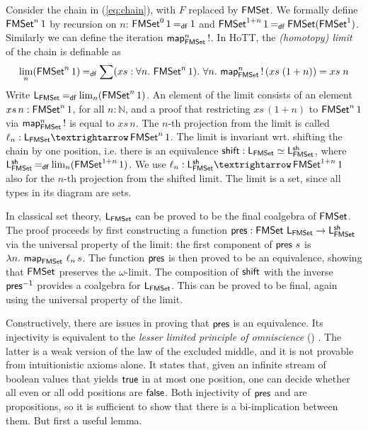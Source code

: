 \documentclass[runningheads]{llncs}
\begin{document}
Consider the chain in (\ref{eq:chain}), with $F$ replaced by $\operatorname{\mathsf{FMSet}}$. We formally define $\operatorname{\mathsf{FMSet}}^n 1$ by recursion on $n$: $\operatorname{\mathsf{FMSet}}^0 1 \mathbin{=_\mathsf{df}} 1$ and $\operatorname{\mathsf{FMSet}}^{1 + n} 1 \mathbin{=_\mathsf{df}} \operatorname{\mathsf{FMSet}} (\operatorname{\mathsf{FMSet}}^1)$. Similarly we can define the iteration $\operatorname{\mathsf{map}}_{\operatorname{\mathsf{FMSet}}}^n\,!$.
In HoTT, the \emph{(homotopy) limit} of the chain is definable as
\[
\lim_{n} (\operatorname{\mathsf{FMSet}}^n 1) \mathbin{=_\mathsf{df}} \sum (xs : \forall n \mathpunct{.}\, \operatorname{\mathsf{FMSet}}^n 1) \mathpunct{.}\, \forall n \mathpunct{.}\,
\operatorname{\mathsf{map}}_{\operatorname{\mathsf{FMSet}}}^n\,!\,(xs\;(1 + n)) = xs\;n
\]
Write $\mathsf{L}_{\operatorname{\mathsf{FMSet}}} \mathbin{=_\mathsf{df}} \lim_{n} (\operatorname{\mathsf{FMSet}}^n 1)$. An element of the limit consists of an element $xs\,n : \operatorname{\mathsf{FMSet}}^n 1$, for all $n : ℕ$, and a proof that restricting $xs\,(1 + n)$ to $\operatorname{\mathsf{FMSet}}^n 1$ via $\operatorname{\mathsf{map}}_{\operatorname{\mathsf{FMSet}}}^n\,!$ is equal to $xs\,n$. The $n$-th projection from the limit is called $\ell_n : \Lim{\FMSet} → \FMSet^n 1$. The limit is invariant wrt. shifting the chain by one position, i.e. there is an equivalence $\mathsf{shift} : \mathsf{L}_{\operatorname{\mathsf{FMSet}}} \simeq \mathsf{L}^{\mathsf{sh}}_{\operatorname{\mathsf{FMSet}}}$, where $\mathsf{L}^{\mathsf{sh}}_{\operatorname{\mathsf{FMSet}}} \mathbin{=_\mathsf{df}} \lim_{n} (\operatorname{\mathsf{FMSet}}^{1 + n} 1)$. We use $\ell_n : \LimSh{\FMSet} → \FMSet^{1+n} 1$ also for the $n$-th projection from the shifted limit.
The limit is a set, since all types in its diagram are sets.

In classical set theory, $\mathsf{L}_{\operatorname{\mathsf{FMSet}}}$ can be proved to be the final coalgebra of $\operatorname{\mathsf{FMSet}}$. The proof proceeds by first constructing a function $\operatorname{\mathsf{pres}} : \operatorname{\mathsf{FMSet}} \,\mathsf{L}_{\operatorname{\mathsf{FMSet}}} \to \mathsf{L}^{\mathsf{sh}}_{\operatorname{\mathsf{FMSet}}}$ via the universal property of the limit: the first component of $\operatorname{\mathsf{pres}} \,s$ is $\lambda n \mathpunct{.}\, \operatorname{\mathsf{map}}_{\operatorname{\mathsf{FMSet}}}\,\ell_n \,s$. The function $\operatorname{\mathsf{pres}}$ is then proved to be an equivalence, showing that $\operatorname{\mathsf{FMSet}}$ preserves the $\omega$-limit. The composition of $\mathsf{shift}$ with the inverse $\operatorname{\mathsf{pres}}^{-1}$ provides a coalgebra for $\mathsf{L}_{\operatorname{\mathsf{FMSet}}}$. This can be proved to be final, again using the universal property of the limit.

Constructively, there are issues in proving that $\operatorname{\mathsf{pres}}$ is an equivalence. Its injectivity is equivalent to the \emph{lesser limited principle of omniscience} (\LLPO{}) \cite[{Ch.\@ 1}]{Bridges1987}. The latter is a weak version of the law of the excluded middle, and it is not provable from intuitionistic axioms alone.  It states that, given an infinite stream of boolean
values that yields $\mathsf{true}$ in at most one position, one can decide
whether all even or all odd positions are $\mathsf{false}$.
Both injectivity of $\operatorname{\mathsf{pres}}$ and \LLPO{} are propositions, so it is sufficient to show that there is a bi-implication between them. But first a useful lemma.
\end{document}
